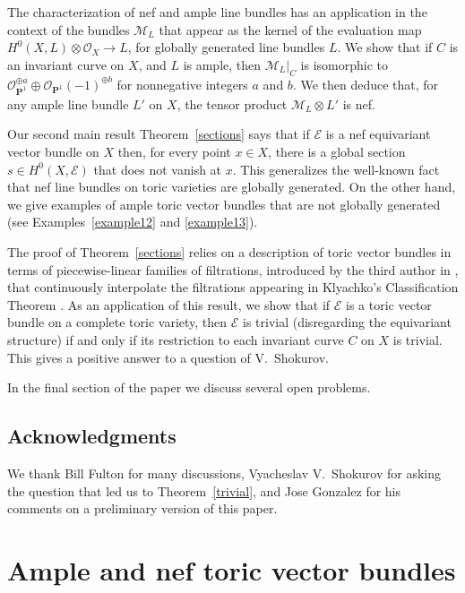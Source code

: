 \documentclass[12pt]{amsart}
\theoremstyle{definition}
\theoremstyle{remark}
\begin{document}
The characterization of nef and ample line bundles has an
application in the context of the bundles ${\mathcal{M}}_L$ that appear as the kernel of the 
evaluation map $H^0(X,L) \otimes {\mathcal{O}}_X \rightarrow L$, for globally generated line bundles $L$. We show that if $C$ is an invariant
curve on $X$, and $L$ is ample, then ${\mathcal{M}}_L\vert_C$ is isomorphic to ${\mathcal{O}}_{{{\mathbf P}}^1}^{\oplus
a}\oplus{\mathcal{O}}_{{{\mathbf P}}^1}(-1)^{\oplus b}$ for nonnegative integers $a$ and
$b$. We then deduce that, for any ample line bundle $L'$ on $X$, the tensor product ${\mathcal{M}}_L\otimes L'$ is nef.

Our second main result Theorem~\ref{sections} says that if ${\mathcal{E}}$ is a nef equivariant
vector bundle on $X$ then, for every point $x\in X$, there is a
global section $s\in H^0(X,{\mathcal{E}})$ that does not vanish at $x$.  This
generalizes the well-known fact that nef line bundles on toric varieties are globally generated. 
On the other hand, we give examples of  ample toric vector bundles that are not globally generated
(see Examples~\ref{example12} and \ref{example13}).

The proof of Theorem~\ref{sections} relies on a description of toric vector bundles in terms of piecewise-linear families of filtrations, introduced by the third author in \cite{Payne}, that continuously interpolate the filtrations appearing in Klyachko's Classification Theorem \cite{Klyachko}.  As an
application of this result, we show that if ${\mathcal{E}}$ is a toric vector bundle on a complete toric variety, then
${\mathcal{E}}$ is trivial (disregarding the equivariant structure) if and
only if its restriction to each invariant curve $C$ on $X$ is
trivial. This gives a positive answer to a question of V.~Shokurov.

In the  final section of the paper we discuss several open problems.

\subsection{Acknowledgments}
We thank Bill Fulton for many discussions,
Vyacheslav V.~Sho\-kurov for asking the question that led us to
Theorem~\ref{trivial}, and Jose Gonzalez for his comments on a preliminary version of this paper.

\section{Ample and nef toric vector bundles}
\end{document}
